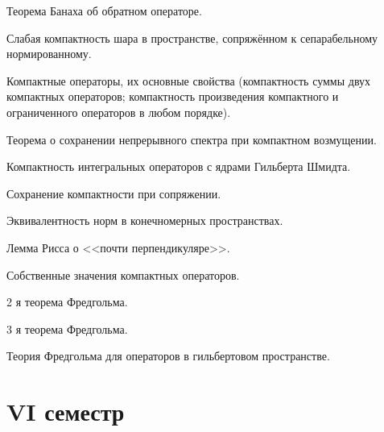 \documentclass[a4paper]{article}
\begin{document}
\begin{nums}{-3}
\item Теорема Банаха об обратном операторе. \cite[III, 5]{ls}
\item Слабая компактность шара в пространстве, сопряжённом к сепарабельному нормированному. \cite[IV, 3]{kf}
\item Компактные операторы, их основные свойства (компактность суммы двух компактных
операторов; компактность произведения компактного и ограниченного операторов
в любом порядке). \cite[IV, 6]{kf}
\item Теорема о сохранении непрерывного спектра при компактном возмущении. \cite{gl}
\item Компактность интегральных операторов с ядрами Гильберта Шмидта. \cite{sh}
\item Сохранение компактности при сопряжении. \cite[IV, 6]{kf}
\item Эквивалентность норм в конечномерных пространствах. \cite[II, 2]{ls}
\item Лемма Рисса о <<почти перпендикуляре>>.
\item Собственные значения компактных операторов. \cite[IV, 6]{kf}
\item 2 я теорема Фредгольма. \cite{ls}
\item 3 я теорема Фредгольма.
\item Теория Фредгольма для операторов в гильбертовом пространстве.
\end{nums}

\pagebreak

\section*{VI семестр}
\end{document}
